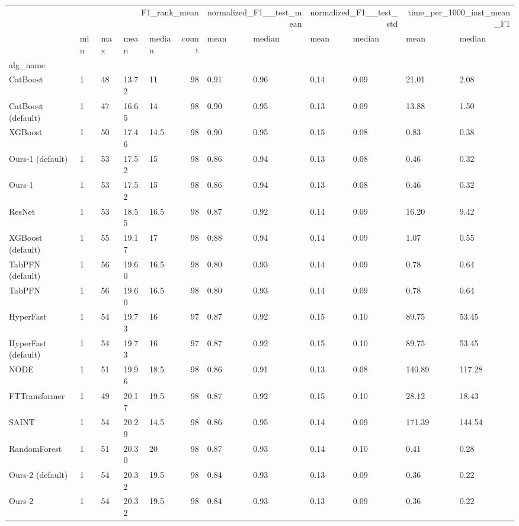 \begin{tabular}{lllllrllllll}
\toprule
 & \multicolumn{5}{r}{F1_rank_mean} & \multicolumn{2}{r}{normalized_F1__test_mean} & \multicolumn{2}{r}{normalized_F1__test_std} & \multicolumn{2}{r}{time_per_1000_inst_mean_F1} \\
 & min & max & mean & median & count & mean & median & mean & median & mean & median \\
alg_name &  &  &  &  &  &  &  &  &  &  &  \\
\midrule
CatBoost & 1 & 48 & 13.72 & 11 & 98 & 0.91 & 0.96 & 0.14 & 0.09 & 21.01 & 2.08 \\
CatBoost (default) & 1 & 47 & 16.65 & 14 & 98 & 0.90 & 0.95 & 0.13 & 0.09 & 13.88 & 1.50 \\
XGBoost & 1 & 50 & 17.46 & 14.5 & 98 & 0.90 & 0.95 & 0.15 & 0.08 & 0.83 & 0.38 \\
Ours-1 (default) & 1 & 53 & 17.52 & 15 & 98 & 0.86 & 0.94 & 0.13 & 0.08 & 0.46 & 0.32 \\
Ours-1 & 1 & 53 & 17.52 & 15 & 98 & 0.86 & 0.94 & 0.13 & 0.08 & 0.46 & 0.32 \\
ResNet & 1 & 53 & 18.55 & 16.5 & 98 & 0.87 & 0.92 & 0.14 & 0.09 & 16.20 & 9.42 \\
XGBoost (default) & 1 & 55 & 19.17 & 17 & 98 & 0.88 & 0.94 & 0.14 & 0.09 & 1.07 & 0.55 \\
TabPFN (default) & 1 & 56 & 19.60 & 16.5 & 98 & 0.80 & 0.93 & 0.14 & 0.09 & 0.78 & 0.64 \\
TabPFN & 1 & 56 & 19.60 & 16.5 & 98 & 0.80 & 0.93 & 0.14 & 0.09 & 0.78 & 0.64 \\
HyperFast & 1 & 54 & 19.73 & 16 & 97 & 0.87 & 0.92 & 0.15 & 0.10 & 89.75 & 53.45 \\
HyperFast (default) & 1 & 54 & 19.73 & 16 & 97 & 0.87 & 0.92 & 0.15 & 0.10 & 89.75 & 53.45 \\
NODE & 1 & 51 & 19.96 & 18.5 & 98 & 0.86 & 0.91 & 0.13 & 0.08 & 140.89 & 117.28 \\
FTTransformer & 1 & 49 & 20.17 & 19.5 & 98 & 0.87 & 0.92 & 0.15 & 0.10 & 28.12 & 18.43 \\
SAINT & 1 & 54 & 20.29 & 14.5 & 98 & 0.86 & 0.95 & 0.14 & 0.09 & 171.39 & 144.54 \\
RandomForest & 1 & 51 & 20.30 & 20 & 98 & 0.87 & 0.93 & 0.14 & 0.10 & 0.41 & 0.28 \\
Ours-2 (default) & 1 & 54 & 20.32 & 19.5 & 98 & 0.84 & 0.93 & 0.13 & 0.09 & 0.36 & 0.22 \\
Ours-2 & 1 & 54 & 20.32 & 19.5 & 98 & 0.84 & 0.93 & 0.13 & 0.09 & 0.36 & 0.22 \\

\end{tabular}
